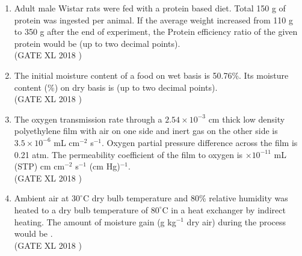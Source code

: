 \documentclass[14pt]{extarticle}
\begin{document}
\begin{flushleft}
\begin{enumerate}
\item Adult male Wistar rats were fed with a protein based diet. Total 150 g of protein was ingested per animal. If the average weight increased from 110 g to 350 g after the end of experiment, the Protein efficiency ratio of the given protein would be \underline{\hspace{2cm}} (up to two decimal points).\\
\hfill(GATE XL 2018 )\\


\item The initial moisture content of a food on wet basis is 50.76\%. Its moisture content (\%) on dry basis is \underline{\hspace{2cm}} (up to two decimal points).\\
\hfill(GATE XL 2018 )\\

\item The oxygen transmission rate through a $2.54\times 10^{-3}$ cm thick low density polyethylene film with air on one side and inert gas on the other side is $3.5\times 10^{-6}$ mL cm$^{-2}$ s$^{-1}$. Oxygen partial pressure difference across the film is 0.21 atm. The permeability coefficient of the film to oxygen is \underline{\hspace{2cm}} $\times 10^{-11}$ mL (STP) cm cm$^{-2}$ s$^{-1}$ (cm Hg)$^{-1}$.\\
\hfill(GATE XL 2018 )\\

\item Ambient air at $30^\circ$C dry bulb temperature and 80\% relative humidity was heated to a dry bulb temperature of $80^\circ$C in a heat exchanger by indirect heating. The amount of moisture gain (g kg$^{-1}$ dry air) during the process would be \underline{\hspace{2cm}}.\\
\hfill(GATE XL 2018 )\\


\end{enumerate}
\end{flushleft}
\end{document}
